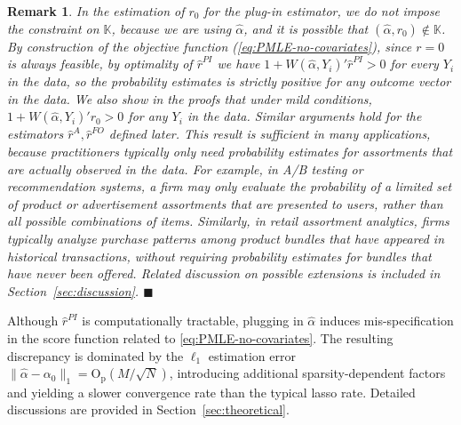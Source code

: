 \documentclass[11pt]{article}
\newtheorem{remark}{Remark}
\newcommand{\proofend}{\hfill$\blacksquare$}
\begin{document}
\begin{remark}\label{remark:non-negativity}
In the estimation of $r_0$ for the plug-in estimator, we do not impose the constraint on $\mathbb{K}$, because we are using $\hat\alpha$, and it is possible that $(\hat\alpha,r_0) \not\in \mathbb{K}$. By construction of the objective function (\ref{eq:PMLE-no-covariates}), since $r=0$ is always feasible, by optimality of $\hat{r}^{PI}$ we have $1+W(\hat\alpha,Y_i)'\hat r^{PI}> 0$ for every $Y_i$ in the data, so the probability estimates is strictly positive for any outcome vector in the data. We also show in the proofs that under mild conditions, $1+W(\hat\alpha,Y_i)'r_0 > 0$ for any $Y_i$ in the data. Similar arguments hold for the estimators $\hat{r}^A, \hat{r}^{FO}$ defined later. This result is sufficient in many applications, because practitioners typically only need probability estimates for assortments that are actually observed in the data. For example, in A/B testing or recommendation systems, a firm may only evaluate the probability of a limited set of product or advertisement assortments that are presented to users, rather than all possible combinations of items. Similarly, in retail assortment analytics, firms typically analyze purchase patterns among product bundles that have appeared in historical transactions, without requiring probability estimates for bundles that have never been offered. Related discussion on possible extensions is included in Section~\ref{sec:discussion}. 
\proofend
\end{remark}
Although $\hat{r}^{PI}$ is computationally tractable, plugging in $\hat{\alpha}$ induces mis-specification in the score function related to \eqref{eq:PMLE-no-covariates}. The resulting discrepancy is dominated by the $\ell_1$ estimation error $\|\hat{\alpha}-\alpha_0\|_1 = \mathrm{O}_{\mathrm{p}}(M/\sqrt{N})$, introducing additional sparsity-dependent factors and yielding a slower convergence rate than the typical lasso rate. Detailed discussions are provided in Section~\ref{sec:theoretical}. 
\end{document}

